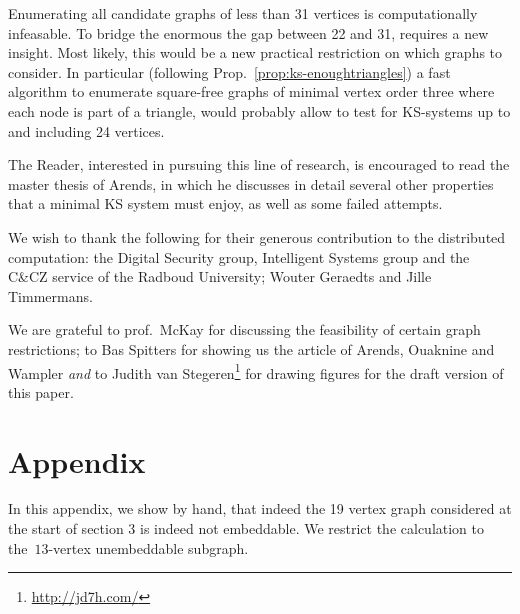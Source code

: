 \documentclass{report}
\begin{document}
Enumerating all candidate graphs of less than 31 vertices
is computationally infeasable.
To bridge the enormous the gap between 22 and 31,
requires a new insight.
Most likely, this would be a new
practical restriction on which graphs to consider.
In particular
(following Prop.~\ref{prop:ks-enoughtriangles})
a fast algorithm to enumerate
square-free graphs of minimal vertex order three
where each node is part of a triangle,
would probably allow to test for KS-systems
up to and including 24 vertices.

The Reader, interested in pursuing this line of research,
is encouraged to read the master thesis\cite{a09} of Arends,
in which he discusses in detail several other
properties that a minimal KS system must enjoy, as well as
some failed attempts.

\begin{acknowledgment}
We wish to thank the following for their generous contribution to the
distributed computation:
    the Digital Security group, Intelligent Systems group
    and the C\&CZ service of the Radboud University;
    Wouter Geraedts and
    Jille Timmermans.

We are grateful to prof.~McKay for discussing the feasibility of
certain graph restrictions; to Bas Spitters for showing us the
article of Arends, Ouaknine and Wampler \emph{and} to Judith van
Stegeren\footnote{\url{http://jd7h.com/}} for drawing figures for
the draft version of this paper.
\end{acknowledgment}

\clearpage
{}


\appendix
\clearpage
\section{Appendix}
In this appendix, we show by hand, that indeed the 19 vertex graph
considered at the start of section 3 %
is indeed not embeddable.
We restrict the calculation to the~$13$-vertex unembeddable
subgraph.
\end{document}

